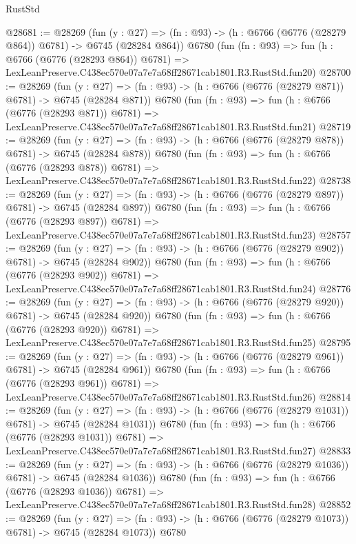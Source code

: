 \begin{lexlean}{RustStd}
\begin{coremodule}
@28681 := @28269
    (fun (y : @27) => (fn : @93) -> (h : @6766 (@6776 (@28279 @864)) @6781) -> @6745 (@28284 @864))
    @6780
    (fun (fn : @93) =>
    fun (h : @6766 (@6776 (@28293 @864)) @6781) =>
    LexLeanPreserve.C438ec570e07a7e7a68ff28671cab1801.R3.RustStd.fun20)
@28700 := @28269
    (fun (y : @27) => (fn : @93) -> (h : @6766 (@6776 (@28279 @871)) @6781) -> @6745 (@28284 @871))
    @6780
    (fun (fn : @93) =>
    fun (h : @6766 (@6776 (@28293 @871)) @6781) =>
    LexLeanPreserve.C438ec570e07a7e7a68ff28671cab1801.R3.RustStd.fun21)
@28719 := @28269
    (fun (y : @27) => (fn : @93) -> (h : @6766 (@6776 (@28279 @878)) @6781) -> @6745 (@28284 @878))
    @6780
    (fun (fn : @93) =>
    fun (h : @6766 (@6776 (@28293 @878)) @6781) =>
    LexLeanPreserve.C438ec570e07a7e7a68ff28671cab1801.R3.RustStd.fun22)
@28738 := @28269
    (fun (y : @27) => (fn : @93) -> (h : @6766 (@6776 (@28279 @897)) @6781) -> @6745 (@28284 @897))
    @6780
    (fun (fn : @93) =>
    fun (h : @6766 (@6776 (@28293 @897)) @6781) =>
    LexLeanPreserve.C438ec570e07a7e7a68ff28671cab1801.R3.RustStd.fun23)
@28757 := @28269
    (fun (y : @27) => (fn : @93) -> (h : @6766 (@6776 (@28279 @902)) @6781) -> @6745 (@28284 @902))
    @6780
    (fun (fn : @93) =>
    fun (h : @6766 (@6776 (@28293 @902)) @6781) =>
    LexLeanPreserve.C438ec570e07a7e7a68ff28671cab1801.R3.RustStd.fun24)
@28776 := @28269
    (fun (y : @27) => (fn : @93) -> (h : @6766 (@6776 (@28279 @920)) @6781) -> @6745 (@28284 @920))
    @6780
    (fun (fn : @93) =>
    fun (h : @6766 (@6776 (@28293 @920)) @6781) =>
    LexLeanPreserve.C438ec570e07a7e7a68ff28671cab1801.R3.RustStd.fun25)
@28795 := @28269
    (fun (y : @27) => (fn : @93) -> (h : @6766 (@6776 (@28279 @961)) @6781) -> @6745 (@28284 @961))
    @6780
    (fun (fn : @93) =>
    fun (h : @6766 (@6776 (@28293 @961)) @6781) =>
    LexLeanPreserve.C438ec570e07a7e7a68ff28671cab1801.R3.RustStd.fun26)
@28814 := @28269
    (fun (y : @27) =>
    (fn : @93) -> (h : @6766 (@6776 (@28279 @1031)) @6781) -> @6745 (@28284 @1031))
    @6780
    (fun (fn : @93) =>
    fun (h : @6766 (@6776 (@28293 @1031)) @6781) =>
    LexLeanPreserve.C438ec570e07a7e7a68ff28671cab1801.R3.RustStd.fun27)
@28833 := @28269
    (fun (y : @27) =>
    (fn : @93) -> (h : @6766 (@6776 (@28279 @1036)) @6781) -> @6745 (@28284 @1036))
    @6780
    (fun (fn : @93) =>
    fun (h : @6766 (@6776 (@28293 @1036)) @6781) =>
    LexLeanPreserve.C438ec570e07a7e7a68ff28671cab1801.R3.RustStd.fun28)
@28852 := @28269
    (fun (y : @27) =>
    (fn : @93) -> (h : @6766 (@6776 (@28279 @1073)) @6781) -> @6745 (@28284 @1073))
    @6780

\end{coremodule}
\end{lexlean}
